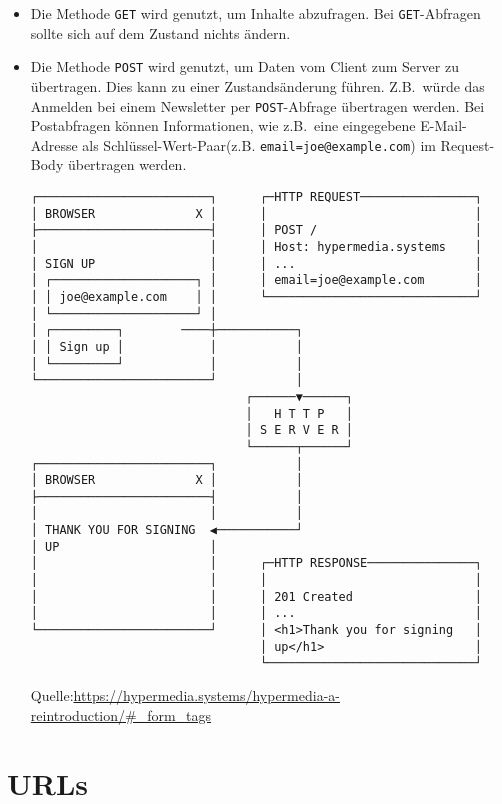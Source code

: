 \documentclass[a4paper]{scrartcl}
\begin{document}
\begin{itemize}
\item Die Methode \texttt{GET} wird genutzt, um Inhalte abzufragen.
Bei \texttt{GET}-Abfragen sollte sich auf dem Zustand nichts ändern.

\item Die Methode \texttt{POST} wird genutzt, um Daten vom Client zum Server zu übertragen.
Dies kann zu einer Zustandsänderung führen.
Z.B.\ würde das Anmelden bei einem Newsletter per \texttt{POST}-Abfrage übertragen werden.
Bei Postabfragen können Informationen, wie z.B.\ eine eingegebene E-Mail-Adresse als Schlüssel-Wert-Paar(z.B. \texttt{email=joe@example.com}) im Request-Body übertragen werden.

\pagebreak
\begin{Verbatim}[label={verb:verbatim}]
┌────────────────────────┐      ┌─HTTP REQUEST────────────────┐
│ BROWSER              X │      │                             │
├────────────────────────┤      │ POST /                      │
│                        │      │ Host: hypermedia.systems    │
│ SIGN UP                │      │ ...                         │
│ ┌────────────────────┐ │      │ email=joe@example.com       │
│ │ joe@example.com    │ │      └─────────────────────────────┘
│ └────────────────────┘ │
│ ┌─────────┐        ────┼───────────┐
│ │ Sign up │            │           │
│ └─────────┘            │           │
└────────────────────────┘           │
                              ┌──────▼──────┐
                              │   H T T P   │
                              │ S E R V E R │
                              └──────┬──────┘
┌────────────────────────┐           │
│ BROWSER              X │           │
├────────────────────────┤           │
│                        │           │
│ THANK YOU FOR SIGNING  ◀───────────┘
│ UP                     │
│                        │      ┌─HTTP RESPONSE───────────────┐
│                        │      │                             │
│                        │      │ 201 Created                 │
│                        │      │ ...                         │
└────────────────────────┘      │ <h1>Thank you for signing   │
                                │ up</h1>                     │
                                └─────────────────────────────┘
\end{Verbatim}
\tiny{Quelle:\url{https://hypermedia.systems/hypermedia-a-reintroduction/#_form_tags}}
\end{itemize}


\section{URLs}\label{sec:urls}
\end{document}
